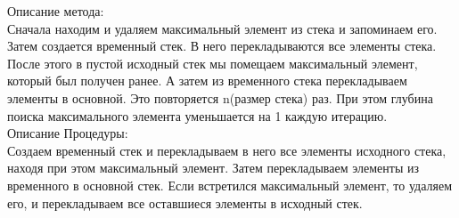 \begin{spacing}{1}

\indent Описание метода:\\
\indent Сначала находим и удаляем максимальный элемент из стека и запоминаем его. 
Затем создается временный стек. В него перекладываются все элементы стека. 
После этого в пустой исходный стек мы помещаем максимальный элемент, который был получен ранее. 
А затем из временного стека перекладываем элементы в основной.
Это повторяется n(размер стека) раз. При этом глубина поиска максимального элемента уменьшается на 1 каждую итерацию.
\\
\indent Описание Процедуры:\\
\indent Создаем временный стек и перекладываем в него все элементы исходного стека, 
находя при этом максимальный элемент. Затем перекладываем элементы из временного в основной стек. 
Если встретился максимальный элемент, то удаляем его, и перекладываем все оставшиеся элементы в исходный стек.

\end{spacing}